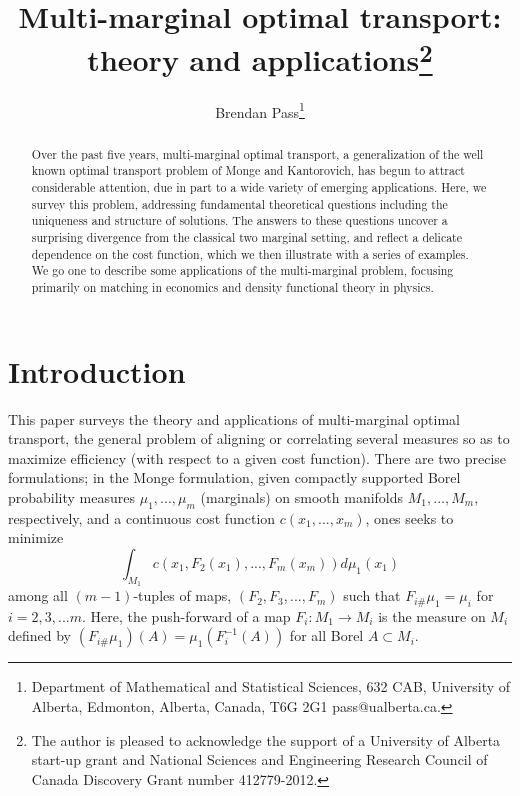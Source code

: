 \documentclass[letter,10pt]{article}
\theoremstyle{dotless}
\begin{document}
\title{Multi-marginal optimal transport: theory and applications\footnote{The author is pleased to acknowledge the support of a University of Alberta start-up grant and National Sciences and Engineering Research Council of Canada Discovery Grant number 412779-2012. 
}}

\author{Brendan Pass\footnote{Department of Mathematical and Statistical Sciences, 632 CAB, University of Alberta, Edmonton, Alberta, Canada, T6G 2G1 pass@ualberta.ca.}}
\maketitle
\begin{abstract} 
Over the past five years, multi-marginal optimal transport, a generalization of the well known optimal transport problem of Monge and Kantorovich, has begun to attract considerable attention, due in part to a wide variety of emerging applications.  Here, we survey this problem, addressing fundamental theoretical questions including the uniqueness and structure of solutions.  The answers to these questions uncover a surprising divergence from the classical two marginal setting, and reflect a delicate dependence on the cost function, which we then illustrate with a series of examples.    We go one to describe some applications of the multi-marginal problem, focusing primarily on matching in economics and density functional theory in physics.

\end{abstract}

\section{Introduction}
This paper surveys the theory and applications of multi-marginal optimal transport, the general problem of aligning or correlating several measures so as to maximize efficiency (with respect to a given cost function).  There are two precise formulations;  in the Monge formulation,  given compactly supported Borel probability measures $\mu_1,...,\mu_m$ (marginals) on smooth manifolds $M_1,...,M_m$, respectively, and a continuous cost function $c(x_1,...,x_m)$, ones seeks to minimize
\begin{equation}\label{mmm}
\int_{M_1 }c(x_1,F_2(x_1),...,F_m(x_m))d\mu_1(x_1)
\end{equation}
among all $(m-1)$-tuples of maps, $(F_2, F_3,...,F_m)$ such that $F_{i\#}\mu_1=\mu_i$  for $i=2,3,...m$.  Here, the push-forward of a map $F_i: M_1 \rightarrow M_i$ is the measure on $M_i$ defined by $(F_{i\#}\mu_1)(A) = \mu_1(F_i^{-1}(A))$ for all Borel $A \subset M_i$.
\end{document}
